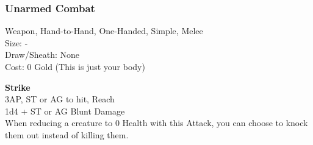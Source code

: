 \subsubsection{Unarmed Combat}\label{weapon:unarmedCombat}
Weapon, Hand-to-Hand, One-Handed, Simple, Melee\\
Size: -\\
Draw/Sheath: None\\
Cost: 0 Gold (This is just your body)

\textbf{Strike}\\
3AP, ST or AG to hit,  Reach\\
1d4 +  ST or AG Blunt Damage\\
When reducing a creature to 0 Health with this Attack, you can choose to knock them out instead of killing them.
